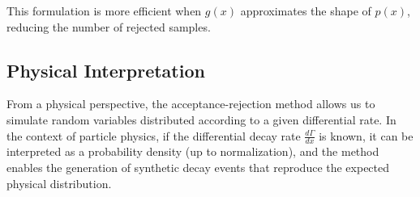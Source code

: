\documentclass[letterpaper,10pt]{article}
\begin{document}
This formulation is more efficient when $g(x)$ approximates the shape of $p(x)$, reducing the number of rejected samples.

\subsection{Physical Interpretation}

From a physical perspective, the acceptance-rejection method allows us to simulate random variables distributed according to a given differential rate. In the context of particle physics, if the differential decay rate $\frac{d\Gamma}{dx}$ is known, it can be interpreted as a probability density (up to normalization), and the method enables the generation of synthetic decay events that reproduce the expected physical distribution.

\printbibliography
\end{document}
